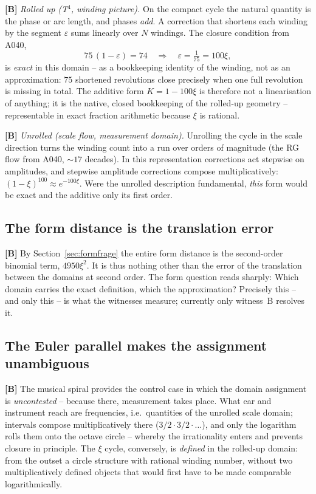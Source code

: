 \textbf{[B]} \emph{Rolled up (T$^4$, winding picture).} On the compact
cycle the natural quantity is the phase or arc length, and phases
\emph{add}. A correction that shortens each winding by the segment
$\varepsilon$ sums linearly over $N$ windings. The closure condition
from A040,
\[
  75\,(1-\varepsilon) = 74 \quad\Rightarrow\quad \varepsilon = \tfrac1{75}
  = 100\xi,
\]
is \emph{exact} in this domain -- as a bookkeeping identity of the
winding, not as an approximation: $75$ shortened revolutions close
precisely when one full revolution is missing in total. The additive
form $K = 1-100\xi$ is therefore not a linearisation of anything; it
is the native, closed bookkeeping of the rolled-up geometry --
representable in exact fraction arithmetic because $\xi$ is rational.

\textbf{[B]} \emph{Unrolled (scale flow, measurement domain).}
Unrolling the cycle in the scale direction turns the winding count
into a run over orders of magnitude (the RG flow from A040,
$\sim17$ decades). In this representation corrections act stepwise on
amplitudes, and stepwise amplitude corrections compose
multiplicatively: $(1-\xi)^{100}\approx e^{-100\xi}$. Were the
unrolled description fundamental, \emph{this} form would be exact and
the additive only its first order.

\subsection{The form distance is the translation error}

\textbf{[B]} By Section~\ref{sec:formfrage} the entire form distance
is the second-order binomial term, $4950\xi^2$. It is thus nothing
other than the error of the translation between the domains at second
order. The form question reads sharply: Which domain carries the
exact definition, which the approximation? Precisely this -- and only
this -- is what the witnesses measure; currently only witness~B resolves it.

\subsection{The Euler parallel makes the assignment unambiguous}

\textbf{[B]} The musical spiral provides the control case in which the
domain assignment is \emph{uncontested} -- because there,
measurement takes place. What ear and instrument reach are
frequencies, i.e.\ quantities of the unrolled scale domain; intervals
compose multiplicatively there ($3/2\cdot3/2\cdot\ldots$), and only
the logarithm rolls them onto the octave circle -- whereby the
irrationality enters and prevents closure in principle. The $\xi$
cycle, conversely, is \emph{defined} in the rolled-up domain: from
the outset a circle structure with rational winding number, without
two multiplicatively defined objects that would first have to be made
comparable logarithmically.

